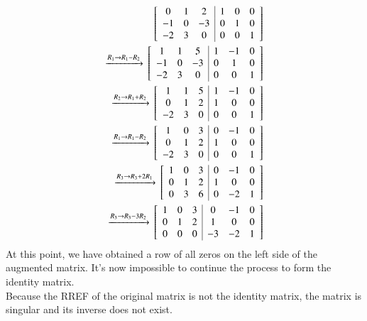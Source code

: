\documentclass[journal]{IEEEtran}
\begin{document}
\begin{align}
    {}\left[\begin{array}{ccc|ccc}
        0  & 1 & 2 & 1 & 0 & 0\\
        -1 & 0 &-3 & 0 & 1 & 0\\
        -2 & 3 & 0 & 0 & 0 & 1
    \end{array}\right]\\ \xrightarrow[]{R_1\rightarrow R_1-R_2}
    {}\left[\begin{array}{ccc|ccc}
        1  & 1 & 5 & 1 & -1 & 0\\
        -1 & 0 &-3 & 0 & 1 & 0\\
        -2 & 3 & 0 & 0 & 0 & 1
    \end{array}\right]\\ \xrightarrow[]{R_2\rightarrow R_1+R_2}
    {}\left[\begin{array}{ccc|ccc}
        1  & 1 & 5 & 1 & -1 & 0\\
        0 & 1 &2 & 1 & 0 & 0\\
        -2 & 3 & 0 & 0 & 0 & 1
    \end{array}\right]\\ \xrightarrow[]{R_1\rightarrow R_1-R_2}
    {}\left[\begin{array}{ccc|ccc}
        1  & 0 & 3 & 0 & -1 & 0\\
        0 & 1 &2 & 1 & 0 & 0\\
        -2 & 3 & 0 & 0 & 0 & 1
    \end{array}\right]\\ \xrightarrow[]{R_3\rightarrow R_3+2R_1}
    {}\left[\begin{array}{ccc|ccc}
        1  & 0 & 3 & 0 & -1 & 0\\
        0 & 1 &2 & 1 & 0 & 0\\
        0 & 3 & 6 & 0 & -2 & 1
    \end{array}\right]\\ \xrightarrow[]{R_3\rightarrow R_3-3R_2}
    {}\left[\begin{array}{ccc|ccc}
        1  & 0 & 3 & 0 & -1 & 0\\
        0 & 1 &2 & 1 & 0 & 0\\
        0 & 0 & 0 & -3 & -2 & 1
    \end{array}\right]
\end{align}
At this point, we have obtained a row of all zeros on the left side of the augmented matrix. It's now impossible to continue the process to form the identity matrix.\\
Because the RREF of the original matrix is not the identity matrix, the matrix is singular and its inverse does not exist.
\end{document}
